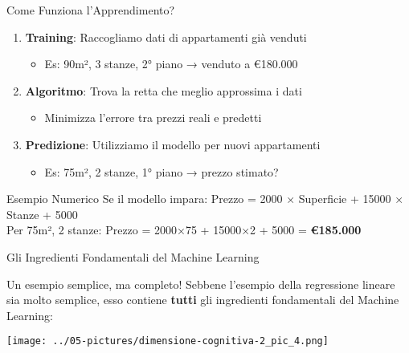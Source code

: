 \documentclass[aspectratio=169]{beamer}
\begin{document}
\begin{frame}{Come Funziona l'Apprendimento?}
\begin{enumerate}
    \item \textbf{Training}: Raccogliamo dati di appartamenti già venduti
    \begin{itemize}
        \item Es: 90m², 3 stanze, 2° piano → venduto a €180.000
    \end{itemize}
    
    \vspace{0.3cm}
    
    \item \textbf{Algoritmo}: Trova la retta che meglio approssima i dati
    \begin{itemize}
        \item Minimizza l'errore tra prezzi reali e predetti
    \end{itemize}
    
    \vspace{0.3cm}
    
    \item \textbf{Predizione}: Utilizziamo il modello per nuovi appartamenti
    \begin{itemize}
        \item Es: 75m², 2 stanze, 1° piano → prezzo stimato?
    \end{itemize}
\end{enumerate}

\vspace{0.5cm}

\begin{alertblock}{Esempio Numerico}
Se il modello impara: Prezzo = 2000 × Superficie + 15000 × Stanze + 5000\\
Per 75m², 2 stanze: Prezzo = 2000×75 + 15000×2 + 5000 = \textbf{€185.000}
\end{alertblock}
\end{frame}
%
%
\begin{frame}{Gli Ingredienti Fondamentali del Machine Learning}
\begin{block}{Un esempio semplice, ma completo!}
Sebbene l'esempio della regressione lineare sia molto semplice, esso contiene \textbf{tutti} gli ingredienti fondamentali del Machine Learning:
\end{block}
\begin{center}
\texttt{[image: ../05-pictures/dimensione-cognitiva-2\_pic\_4.png]} 
\end{center}
\end{frame}
\end{document}
